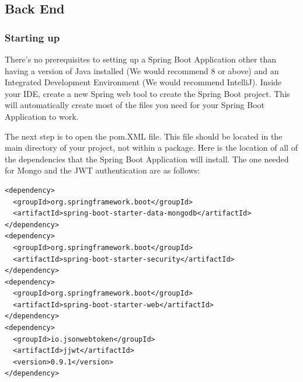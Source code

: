\subsection{Back End}
\subsubsection{Starting up}
There's no prerequisites to setting up a Spring Boot Application other than having a version of Java installed (We would recommend 8 or above) and an Integrated Development Environment (We would recommend IntelliJ). Inside your IDE, create a new Spring web tool to create the Spring Boot project. This will automatically create most of the files you need for your Spring Boot Application to work. \par
The next step is to open the pom.XML file. This file should be located in the main directory of your project, not within a package. Here is the location of all of the dependencies that the Spring Boot Application will install. The one needed for Mongo and the JWT authentication are as follows: \par
\begin{verbatim}
<dependency>
  <groupId>org.springframework.boot</groupId>
  <artifactId>spring-boot-starter-data-mongodb</artifactId>
</dependency>
<dependency>
  <groupId>org.springframework.boot</groupId>
  <artifactId>spring-boot-starter-security</artifactId>
</dependency>
<dependency>
  <groupId>org.springframework.boot</groupId>
  <artifactId>spring-boot-starter-web</artifactId>
</dependency>
<dependency>
  <groupId>io.jsonwebtoken</groupId>
  <artifactId>jjwt</artifactId>
  <version>0.9.1</version>
</dependency>
\end{verbatim}
